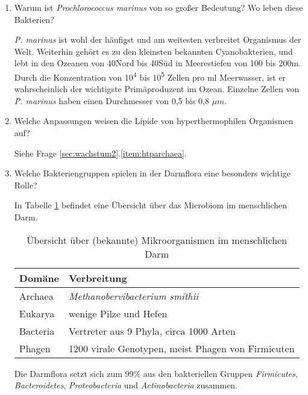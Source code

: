 \begin{enumerate}
	\item Warum ist \emph{Prochlorococcus marinus} von so großer Bedeutung? Wo leben diese Bakterien?

		\emph{P. marinus} ist wohl der häufigst und am weitesten verbreitet Organismus der Welt.
		Weiterhin gehört es zu den kleinsten bekannten Cyanobakterien, 
		und lebt in den Ozeanen von 40\textdegree Nord bis 40\textdegree Süd in Meerestiefen von 100 bis 200m.
		Durch die Konzentration von 10\textsuperscript{4} bis 10\textsuperscript{5} Zellen pro ml Meerwasser,
		ist er wahrscheinlich der wichtigste Primäproduzent im Ozean.
		Einzelne Zellen von \emph{P. marinus} haben einen Durchmesser von 0,5 bis 0,8 \begin{math}\mu m\end{math}.

	\item Welche Anpassungen weisen die Lipide von hyperthermophilen Organismen auf?

		Siehe Frage \ref{sec:wachstum2}.\ref{item:htparchaea}.

	\item Welche Bakteriengruppen spielen in der Darmflora eine besonders wichtige Rolle?
		
		In Tabelle \ref{tab:darmMO} befindet eine Übersicht über das Microbiom im menschlichen Darm.

		\begin{table}[h]
		\begin{center}
		\begin{tabular}{l l}
		\toprule
		Domäne		&		Verbreitung \\
		\midrule
		Archaea		&		\emph{Methanobervibacterium smithii}	\\
		Eukarya		&		wenige Pilze und Hefen 		\\
		Bacteria		&		Vertreter aus 9 Phyla, circa 1000 Arten 	\\
		Phagen		&		1200 virale Genotypen, meist Phagen von Firmicuten \\
		\bottomrule
		\end{tabular}
		\caption{Übersicht über (bekannte) Mikroorganismen im menschlichen Darm}
		\label{tab:darmMO}
		\end{center}
		\end{table}

		Die Darmflora setzt sich zum 99\% aus den bakteriellen Gruppen \emph{Firmicutes},
		\emph{Bacteroidetes}, \emph{Proteobacteria} und \emph{Actinobacteria} zusammen.		%


\end{enumerate}
